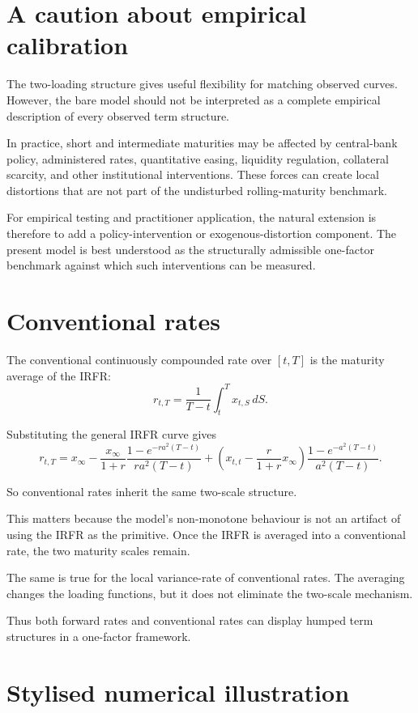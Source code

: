 \documentclass[11pt]{article}
\theoremstyle{plainbreak}
\begin{document}
\section{A caution about empirical calibration}

The two-loading structure gives useful flexibility for matching observed curves. However, the bare model should not be interpreted as a complete empirical description of every observed term structure.

In practice, short and intermediate maturities may be affected by central-bank policy, administered rates, quantitative easing, liquidity regulation, collateral scarcity, and other institutional interventions. These forces can create local distortions that are not part of the undisturbed rolling-maturity benchmark.

For empirical testing and practitioner application, the natural extension is therefore to add a policy-intervention or exogenous-distortion component. The present model is best understood as the structurally admissible one-factor benchmark against which such interventions can be measured.

\section{Conventional rates}

The conventional continuously compounded rate over \([t,T]\) is the maturity average of the IRFR:
\[
r_{t,T}=\frac{1}{T-t}\int_t^T x_{t,S}\,dS.
\]

Substituting the general IRFR curve gives
\[
r_{t,T}
=
x_\infty
-
\frac{x_\infty}{1+r}\frac{1-e^{-ra^2(T-t)}}{ra^2(T-t)}
+
\left(x_{t,t}-\frac{r}{1+r}x_\infty\right)
\frac{1-e^{-a^2(T-t)}}{a^2(T-t)}.
\]

So conventional rates inherit the same two-scale structure.

This matters because the model's non-monotone behaviour is not an artifact of using the IRFR as the primitive. Once the IRFR is averaged into a conventional rate, the two maturity scales remain.

The same is true for the local variance-rate of conventional rates. The averaging changes the loading functions, but it does not eliminate the two-scale mechanism.

Thus both forward rates and conventional rates can display humped term structures in a one-factor framework.


\section{Stylised numerical illustration}
\end{document}
